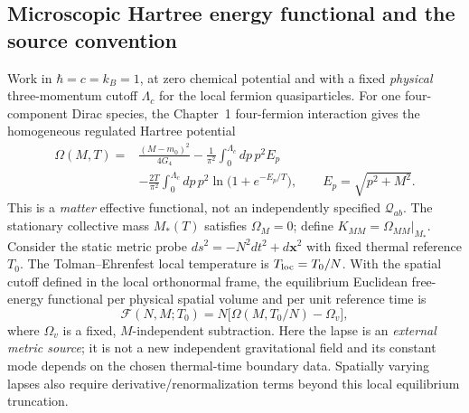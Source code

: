 \documentclass[11pt,a4paper]{article}
\theoremstyle{remark}\newtheorem{remark}[theorem]{Remark}
\begin{document}
\subsection{Microscopic Hartree energy functional and the source convention}
Work in $\hbar=c=k_B=1$, at zero chemical potential and with a fixed
\emph{physical} three-momentum cutoff $\Lambda_c$ for the local fermion
quasiparticles. For one four-component Dirac species, the Chapter~1
four-fermion interaction gives the homogeneous regulated Hartree potential
\begin{equation}\label{eq:v34-omega}
\boxed{\begin{aligned}
\Omega(M,T)={}&\frac{(M-m_0)^2}{4G_4}
-\frac{1}{\pi^2}\int_0^{\Lambda_c}dp\,p^2E_p\\
&-\frac{2T}{\pi^2}\int_0^{\Lambda_c}dp\,p^2
\ln\bigl(1+e^{-E_p/T}\bigr),\qquad E_p=\sqrt{p^2+M^2}.
\end{aligned}}
\end{equation}
This is a \emph{matter} effective functional, not an independently specified
$\mathcal Q_{ab}$. The stationary collective mass $M_*(T)$ satisfies
$\Omega_M=0$; define $K_{MM}=\Omega_{MM}|_{M_*}$.
Consider the static metric probe
$ds^2=-N^2dt^2+d\mathbf x^2$ with fixed thermal reference $T_0$.
The Tolman--Ehrenfest local temperature is $T_{\rm loc}=T_0/N$.
With the spatial cutoff defined in the local orthonormal frame,
the equilibrium Euclidean free-energy functional per physical spatial
volume and per unit reference time is
\begin{equation}\label{eq:v34-F}
\boxed{\mathcal F(N,M;T_0)=N\bigl[\Omega(M,T_0/N)-\Omega_v\bigr],}
\end{equation}
where $\Omega_v$ is a fixed, $M$-independent subtraction. Here the lapse
is an \emph{external metric source}; it is not a new independent gravitational
field and its constant mode depends on the chosen thermal-time boundary data.
Spatially varying lapses also require derivative/renormalization terms
beyond this local equilibrium truncation.
\end{document}
